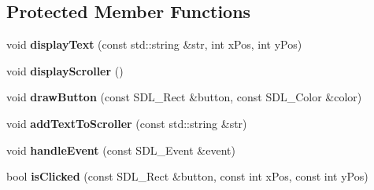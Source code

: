 \subsection*{Protected Member Functions}
\begin{DoxyCompactItemize}
\item 
void {\bfseries display\+Text} (const std\+::string \&str, int x\+Pos, int y\+Pos)\hypertarget{classScene_a19f1ae5bf5e6028b07044d5611ffc609}{}\label{classScene_a19f1ae5bf5e6028b07044d5611ffc609}

\item 
void {\bfseries display\+Scroller} ()\hypertarget{classScene_ab819ce5ff68c07408e5c7e8353950220}{}\label{classScene_ab819ce5ff68c07408e5c7e8353950220}

\item 
void {\bfseries draw\+Button} (const S\+D\+L\+\_\+\+Rect \&button, const S\+D\+L\+\_\+\+Color \&color)\hypertarget{classScene_a272378aa86e91b2f24ea8b82989d7bf9}{}\label{classScene_a272378aa86e91b2f24ea8b82989d7bf9}

\item 
void {\bfseries add\+Text\+To\+Scroller} (const std\+::string \&str)\hypertarget{classScene_a5c015411283ae64c0639103ef83eddd6}{}\label{classScene_a5c015411283ae64c0639103ef83eddd6}

\item 
void {\bfseries handle\+Event} (const S\+D\+L\+\_\+\+Event \&event)\hypertarget{classScene_a89937129ba4b9e6d248ec1cb5f2d7147}{}\label{classScene_a89937129ba4b9e6d248ec1cb5f2d7147}

\item 
bool {\bfseries is\+Clicked} (const S\+D\+L\+\_\+\+Rect \&button, const int x\+Pos, const int y\+Pos)\hypertarget{classScene_a29a09821280c1307f198d98edd193870}{}\label{classScene_a29a09821280c1307f198d98edd193870}

\end{DoxyCompactItemize}
